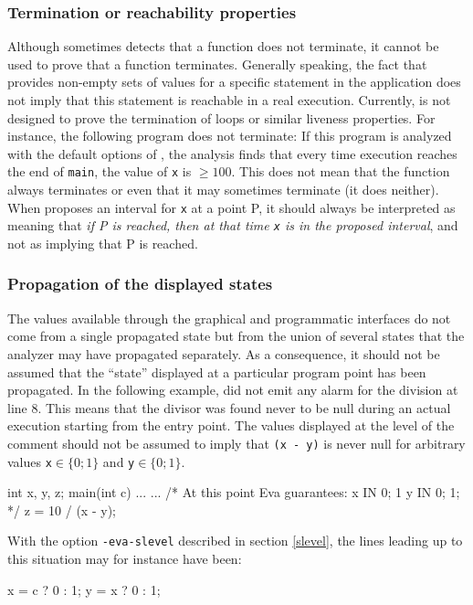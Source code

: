 \documentclass{frama-c-book}
\begin{document}
\subsubsection{Termination or reachability properties}
Although \Eva{} sometimes detects that
a function does not terminate, it cannot be used to prove that a
function terminates. Generally speaking, the fact that \Eva{}
provides non-empty sets of values for a specific statement in
the application does not imply that this statement is reachable in a
real execution. Currently, \Eva{} is not designed to prove
the termination of loops or similar liveness properties.
For instance,
the following program does not terminate:
If this program is analyzed
with the default options of \Eva{}, the analysis finds
that every time execution reaches the end of \lstinline|main|, the value
of \lstinline|x| is $\geq 100$. This does
not mean that the function always terminates or even that it may
sometimes terminate (it does neither). When \Eva{}
proposes an interval for \lstinline|x| at a point P,
it should always be interpreted as meaning
that {\em if P is reached, then at that time \lstinline|x| is in
the proposed interval}, and
not as implying that P is reached.

\subsubsection{Propagation of the displayed states}
The values available through the graphical and programmatic interfaces
do not come from a single propagated state but from the union of
several states that the analyzer may have propagated separately.
As a consequence, it should not be assumed that the ``state''
displayed at a particular program point has been propagated.
In the following example, \Eva{} did not emit any alarm
for the division at line 8. This means that the divisor was found never
to be null during an actual execution starting from the entry point.
The values displayed at the level of the comment should not be
assumed to imply that \lstinline|(x - y)| is never null
for arbitrary values \lstinline|x|$\in\{0;1\}$
and \lstinline|y|$\in\{0;1\}$.
\begin{listing}{1}
int x, y, z;
main(int c){
  ...
  ...
/* At this point Eva guarantees:
   x IN {0; 1}
   y IN {0; 1}; */
  z = 10 / (x - y);
}
\end{listing}
\goodbreak

With the option \lstinline|-eva-slevel| described in section \ref{slevel},
the lines leading up to this situation may for instance have been:
\begin{listing}{3}
  x = c ? 0 : 1;
  y = x ? 0 : 1;
\end{listing}
\end{document}
